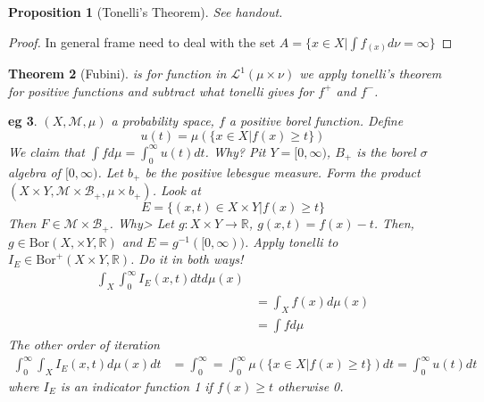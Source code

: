 \documentclass[letterpaper, 12pt]{article}
\newcommand{\fin}{\qquad \quad \hfill \framebox[1.75mm][l]{\,}}
\newcommand{\cL}{\mathcal{L}}
\newcommand{\cB}{\mathcal{B}}
\newcommand{\cM}{\mathcal{M}}
\newcommand{\bR}{\mathbb{R}}
\newcommand{\Bor}{\mathrm{Bor}}
\theoremstyle{stdthm}
\newtheorem{thm}{Theorem}[section]
\newtheorem{prop}[thm]{Proposition}
\theoremstyle{stddef}
\newtheorem{eg}[thm]{eg} %
\theoremstyle{stdnonum}
\theoremstyle{stdqands}
\theoremstyle{stdbold}
\begin{document}
 \begin{prop} [Tonelli's Theorem]
 See handout. 
 \end{prop}
 
 \begin{proof}
 In general frame need to deal with the set $A = \{x \in X| \int f_{(x)} d\nu = \infty \}$
 \end{proof}
 
 \begin{thm}[Fubini]
 is for function in $\cL^1(\mu \times \nu)$ we apply tonelli's theorem for positive functions and subtract what tonelli gives for $f^+$ and $f^-$. 
 \end{thm}
 
 \begin{eg}
 $(X,\cM, \mu)$ a probability space, $f$ a positive borel function. Define 
 \[ u(t) = \mu(\{x \in X| f(x) \geq t \}) \]
 We claim that $\int f d\mu = \int_0^\infty u(t)dt$.  Why? Pit $Y = [0,\infty)$, $B_+$ is the borel $\sigma$ algebra of $[0,\infty)$. Let $b_+$ be the positive lebesgue measure. Form the product $(X \times Y, \cM \times \cB_+,\mu \times b_+)$. Look at 
 \[E = \{(x,t) \in X \times Y| f(x) \geq t \}\] Then $F \in \cM \times \cB_+$. Why> Let $g: X\times Y \to \bR$, $g(x,t) = f(x) - t$. Then, $g \in \Bor(X,\times Y, \bR)$ and $E = g^{-1}([0,\infty))$. Apply tonelli to $I_E \in \Bor^+(X\times Y, \bR)$. Do it in both ways! 
 \begin{align*}
 \int_X \int_0^\infty I_E(x,t) dt d\mu(x) \\
 &= \int_X f(x) d\mu(x) \\
 &= \int f d\mu
 \end{align*}
 The other order of iteration
 \begin{align*}
 \int_0^\infty \int_X I_E(x,t)d\mu(x)  dt &= \int_0^\infty = \int_0^\infty \mu(\{x \in X| f(x) \geq t \}) dt = \int_0^\infty u(t)dt 
 \end{align*}
 where $I_E$ is an indicator function 1 if $f(x) \geq t$ otherwise 0. 
 \end{eg}
\end{document}
